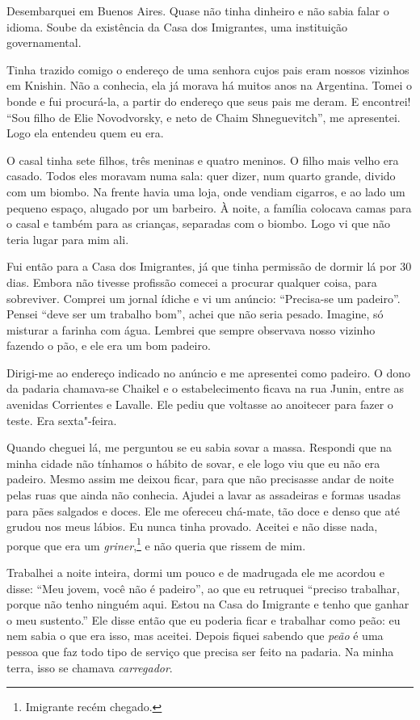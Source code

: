 Desembarquei em Buenos Aires. Quase não tinha dinheiro e não sabia falar
o idioma. Soube da existência da Casa dos Imigrantes, uma instituição governamental.

Tinha trazido comigo o endereço de uma senhora cujos pais eram nossos
vizinhos em Knishin. Não a conhecia, ela já morava há muitos anos
na Argentina. Tomei o bonde e fui procurá-la, a partir do endereço que seus pais me deram. E encontrei! ``Sou filho de Elie Novodvorsky, e neto de Chaim Shneguevitch'', me
apresentei. Logo ela entendeu quem eu era. 

O casal tinha sete filhos, três meninas e quatro meninos. O filho mais
velho era casado. Todos eles moravam numa sala: quer dizer, num quarto
grande, divido com um biombo. Na frente havia uma loja, onde vendiam cigarros, e ao lado um pequeno espaço, alugado por um
barbeiro. À noite, a família colocava camas para o casal e também para as
crianças, separadas com o biombo. Logo vi que não teria lugar para
mim ali.

Fui então para a Casa dos Imigrantes, já que tinha permissão de dormir
lá por 30 dias. Embora não tivesse profissão comecei a procurar qualquer
coisa, para sobreviver. Comprei um jornal ídiche e vi um anúncio:
``Precisa-se um padeiro''. Pensei ``deve ser um trabalho bom'', achei
que não seria pesado. Imagine, só misturar a farinha com água. Lembrei que sempre observava nosso vizinho fazendo o pão, e ele era um
bom padeiro.

Dirigi-me ao endereço indicado no anúncio e me apresentei como padeiro.
O dono da padaria chamava-se Chaikel e o estabelecimento ficava na rua
Junin, entre as avenidas Corrientes e Lavalle. Ele pediu que voltasse ao
anoitecer para fazer o teste. Era sexta"-feira. 

Quando cheguei lá, me perguntou se eu sabia sovar a massa. Respondi que na minha cidade não
tínhamos o hábito de sovar, e ele logo viu que eu não era padeiro.
Mesmo assim me deixou ficar, para que não precisasse andar de noite pelas ruas que
ainda não conhecia. Ajudei a lavar as assadeiras e formas usadas para pães salgados e doces. Ele me ofereceu chá-mate, tão doce e denso que até grudou nos
meus lábios. Eu nunca tinha provado. Aceitei e não disse nada, porque
que era um \textit{griner},\footnote{Imigrante recém chegado.} e não queria
que rissem de mim.

Trabalhei a noite inteira, dormi um pouco e de madrugada ele me acordou
e disse: ``Meu jovem, você não é padeiro'', ao que eu retruquei ``preciso
trabalhar, porque não tenho ninguém aqui. Estou na Casa do Imigrante e
tenho que ganhar o meu sustento.'' Ele disse então que eu poderia ficar
e trabalhar como peão: eu nem sabia o que era isso, mas aceitei. Depois
fiquei sabendo que \textit{peão} é uma pessoa que faz todo tipo de serviço
que precisa ser feito na padaria. Na minha terra, isso se chamava \textit{carregador}.

